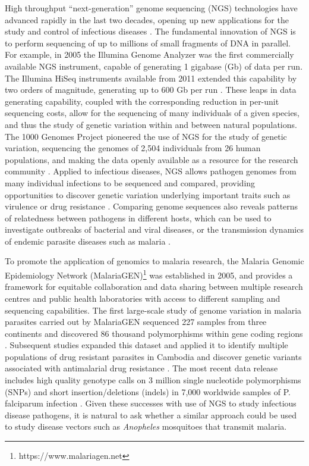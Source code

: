 \documentclass[a4paper,11pt,abstracton,hidelinks]{scrartcl}
\begin{document}
High throughput ``next-generation'' genome sequencing (NGS) technologies have advanced rapidly in the last two decades, opening up new applications for the study and control of infectious diseases \citep{Goodwin2016}.
%
The fundamental innovation of NGS is to perform sequencing of up to millions of small fragments of DNA in parallel.
%
For example, in 2005 the Illumina Genome Analyzer was the first commercially available NGS instrument, capable of generating 1 gigabase (Gb) of data per run.
%
The Illumina HiSeq instruments available from 2011 extended this capability by two orders of magnitude, generating up to 600 Gb per run \citep{Illumina2017}.
%
These leaps in data generating capability, coupled with the corresponding reduction in per-unit sequencing costs, allow for the sequencing of many individuals of a given species, and thus the study of genetic variation within and between natural populations.
%
The 1000 Genomes Project pioneered the use of NGS for the study of genetic variation, sequencing the genomes of 2,504 individuals from 26 human populations, and making the data openly available as a resource for the research community \citep{1000G2015}.
%
Applied to infectious diseases, NGS allows pathogen genomes from many individual infections to be sequenced and compared, providing opportunities to discover genetic variation underlying important traits such as virulence or drug resistance \citep{Armstrong2019}.
%
Comparing genome sequences also reveals patterns of relatedness between pathogens in different hosts, which can be used to investigate outbreaks of bacterial and viral diseases, or the transmission dynamics of endemic parasite diseases such as malaria \citep{Robinson2013,Daniels2015,Wohl2016,Neafsey2017,Wesolowski2018,Armstrong2019}.

To promote the application of genomics to malaria research, the Malaria Genomic Epidemiology Network (MalariaGEN)\footnote{https://www.malariagen.net} was established in 2005, and provides a framework for equitable collaboration and data sharing between multiple research centres and public health laboratories with access to different sampling and sequencing capabilities. 
%
The first large-scale study of genome variation in malaria parasites carried out by MalariaGEN sequenced 227 samples from three continents and discovered 86 thousand polymorphisms within gene coding regions \citep{Manske2012}.
%
Subsequent studies expanded this dataset and applied it to identify multiple populations of drug resistant parasites in Cambodia and discover genetic variants associated with antimalarial drug resistance \citep{Miotto2013,Miotto2015}.
%
The most recent data release includes high quality genotype calls on 3 million single nucleotide polymorphisms (SNPs) and short insertion/deletions (indels) in 7,000 worldwide samples of P. falciparum infection \citep{MalariaGEN2019PF}.
%
Given these successes with use of NGS to study infectious disease pathogens, it is natural to ask whether a similar approach could be used to study disease vectors such as \textit{Anopheles} mosquitoes that transmit malaria.
%
\end{document}
